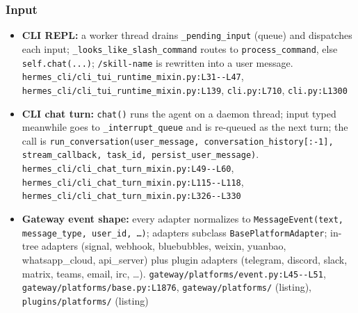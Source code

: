 \subsubsection*{Input}
\begin{itemize}
\item \textbf{CLI REPL:} a worker thread drains \texttt{\_\allowbreak{}pending\_\allowbreak{}input} (queue) and dispatches each input; \texttt{\_\allowbreak{}looks\_\allowbreak{}like\_\allowbreak{}slash\_\allowbreak{}command} routes to \texttt{process\_\allowbreak{}command}, else \texttt{self.\allowbreak{}chat(\allowbreak{}.\allowbreak{}.\allowbreak{}.\allowbreak{})}; \texttt{/\allowbreak{}skill-\allowbreak{}name} is rewritten into a user message. \texttt{hermes\_\allowbreak{}cli/\allowbreak{}cli\_\allowbreak{}tui\_\allowbreak{}runtime\_\allowbreak{}mixin.\allowbreak{}py:\allowbreak{}L31-\allowbreak{}-\allowbreak{}L47}, \texttt{hermes\_\allowbreak{}cli/\allowbreak{}cli\_\allowbreak{}tui\_\allowbreak{}runtime\_\allowbreak{}mixin.\allowbreak{}py:\allowbreak{}L139}, \texttt{cli.\allowbreak{}py:\allowbreak{}L710}, \texttt{cli.\allowbreak{}py:\allowbreak{}L1300}
\item \textbf{CLI chat turn:} \texttt{chat(\allowbreak{})} runs the agent on a daemon thread; input typed meanwhile goes to \texttt{\_\allowbreak{}interrupt\_\allowbreak{}queue} and is re-queued as the next turn; the call is \texttt{run\_\allowbreak{}conversation(\allowbreak{}user\_\allowbreak{}message, conversation\_\allowbreak{}history[:\allowbreak{}-\allowbreak{}1], stream\_\allowbreak{}callback, task\_\allowbreak{}id, persist\_\allowbreak{}user\_\allowbreak{}message)}. \texttt{hermes\_\allowbreak{}cli/\allowbreak{}cli\_\allowbreak{}chat\_\allowbreak{}turn\_\allowbreak{}mixin.\allowbreak{}py:\allowbreak{}L49-\allowbreak{}-\allowbreak{}L60}, \texttt{hermes\_\allowbreak{}cli/\allowbreak{}cli\_\allowbreak{}chat\_\allowbreak{}turn\_\allowbreak{}mixin.\allowbreak{}py:\allowbreak{}L115-\allowbreak{}-\allowbreak{}L118}, \texttt{hermes\_\allowbreak{}cli/\allowbreak{}cli\_\allowbreak{}chat\_\allowbreak{}turn\_\allowbreak{}mixin.\allowbreak{}py:\allowbreak{}L326-\allowbreak{}-\allowbreak{}L330}
\item \textbf{Gateway event shape:} every adapter normalizes to \texttt{MessageEvent(\allowbreak{}text, message\_\allowbreak{}type, user\_\allowbreak{}id, \ldots{})}; adapters subclass \texttt{BasePlatformAdapter}; in-tree adapters (signal, webhook, bluebubbles, weixin, yuanbao, whatsapp\_cloud, api\_server) plus plugin adapters (telegram, discord, slack, matrix, teams, email, irc, \ldots{}). \texttt{gateway/\allowbreak{}platforms/\allowbreak{}event.\allowbreak{}py:\allowbreak{}L45-\allowbreak{}-\allowbreak{}L51}, \texttt{gateway/\allowbreak{}platforms/\allowbreak{}base.\allowbreak{}py:\allowbreak{}L1876}, \texttt{gateway/\allowbreak{}platforms/\allowbreak{}} (listing), \texttt{plugins/\allowbreak{}platforms/\allowbreak{}} (listing)

\end{itemize}

